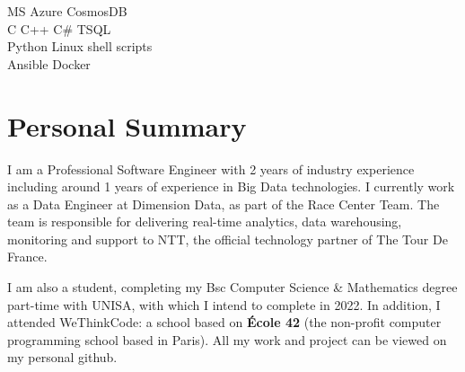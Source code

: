 \documentclass[]{deedy-resume-openfont}
\begin{document}
\begin{minipage}[t]{0.33\textwidth}
MS Azure \textbullet{} CosmosDB \\

C \textbullet{} C++ \textbullet{} C\# \textbullet{}  TSQL \\

Python \textbullet{} Linux shell scripts \\


Ansible \textbullet{} Docker \\
\sectionsep



%
%

\end{minipage} 
\hfill
\begin{minipage}[t]{0.66\textwidth} 



\section{Personal Summary}

I am a Professional Software Engineer with 2 years of industry experience including around 1 years of experience in Big Data technologies. I currently work as a Data Engineer at Dimension Data, as part of the Race Center Team. The team is responsible for delivering real-time analytics, data warehousing,  monitoring and support to NTT, the official technology partner of The Tour De France.

 \sectionsep
I am also a student, completing my Bsc Computer Science \& Mathematics degree part-time with UNISA, with which I intend to complete in 2022. In addition, I attended WeThinkCode: a school based on \textbf{École 42} (the non-profit computer programming school based in Paris). All my work and project can be viewed on my personal github.  
\sectionsep





\end{minipage}
\end{document}
